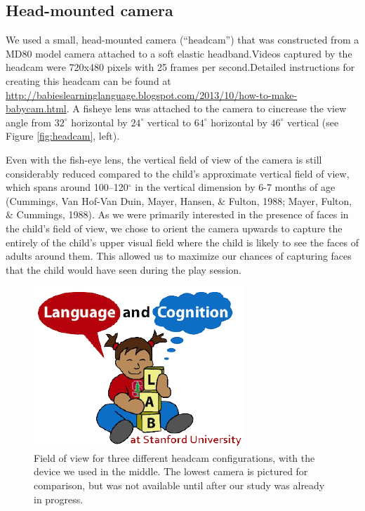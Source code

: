 \documentclass[10pt, letterpaper]{article}
\newenvironment{CodeChunk}{}{}
\begin{document}
\subsection{Head-mounted camera}\label{head-mounted-camera}

We used a small, head-mounted camera (``headcam'') that was constructed
from a MD80 model camera attached to a soft elastic headband.Videos
captured by the headcam were 720x480 pixels with 25 frames per
second.Detailed instructions for creating this headcam can be found at
\url{http://babieslearninglanguage.blogspot.com/2013/10/how-to-make-babycam.html}.
A fisheye lens was attached to the camera to cincrease the view angle
from \(32^{\circ}\) horizontal by \(24^{\circ}\) vertical to
\(64^{\circ}\) horizontal by \(46^{\circ}\) vertical (see Figure
\ref{fig:headcam}, left).

Even with the fish-eye lens, the vertical field of view of the camera is
still considerably reduced compared to the child's approximate vertical
field of view, which spans around 100--120\(^{\circ}\) in the vertical
dimension by 6-7 months of age (Cummings, Van Hof-Van Duin, Mayer,
Hansen, \& Fulton, 1988; Mayer, Fulton, \& Cummings, 1988). As we were
primarily interested in the presence of faces in the child's field of
view, we chose to orient the camera upwards to capture the entirely of
the child's upper visual field where the child is likely to see the
faces of adults around them. This allowed us to maximize our chances of
capturing faces that the child would have seen during the play session.

\begin{CodeChunk}
\begin{figure}[H]

{\centering \includegraphics{figs/image-1} 

}

\caption[Field of view for three different headcam configurations, with the device we used in the middle]{Field of view for three different headcam configurations, with the device we used in the middle. The lowest camera is pictured for comparison, but was not available until after our study was already in progress.}\label{fig:image}
\end{figure}
\end{CodeChunk}
\end{document}
